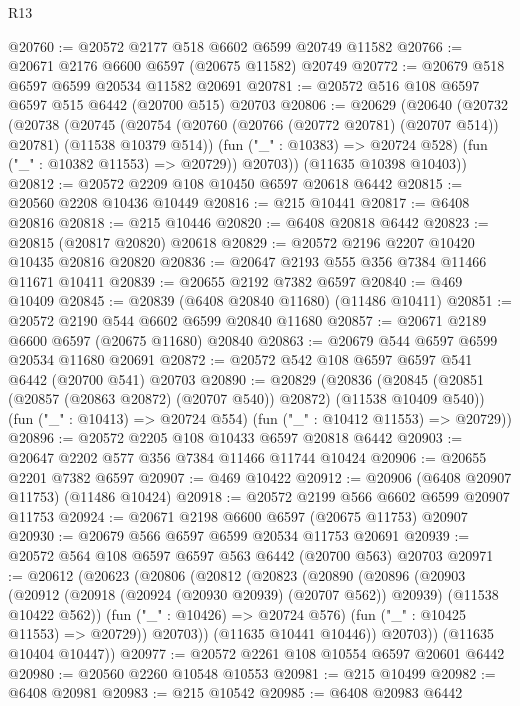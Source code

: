 \begin{lexlean}{R13}
\begin{coremodule}
@20760 := @20572 @2177 @518 @6602 @6599 @20749 @11582
@20766 := @20671 @2176 @6600 @6597 (@20675 @11582) @20749
@20772 := @20679 @518 @6597 @6599 @20534 @11582 @20691
@20781 := @20572 @516 @108 @6597 @6597 @515 @6442 (@20700 @515) @20703
@20806 := @20629
    (@20640
      (@20732
        (@20738
          (@20745
            (@20754 (@20760 (@20766 (@20772 @20781) (@20707 @514)) @20781) (@11538 @10379 @514))
            (fun ("_" : @10383) => @20724 @528)
            (fun ("_" : @10382 @11553) => @20729))
          @20703))
      (@11635 @10398 @10403))
@20812 := @20572 @2209 @108 @10450 @6597 @20618 @6442
@20815 := @20560 @2208 @10436 @10449
@20816 := @215 @10441
@20817 := @6408 @20816
@20818 := @215 @10446
@20820 := @6408 @20818 @6442
@20823 := @20815 (@20817 @20820) @20618
@20829 := @20572 @2196 @2207 @10420 @10435 @20816 @20820
@20836 := @20647 @2193 @555 @356 @7384 @11466 @11671 @10411
@20839 := @20655 @2192 @7382 @6597
@20840 := @469 @10409
@20845 := @20839 (@6408 @20840 @11680) (@11486 @10411)
@20851 := @20572 @2190 @544 @6602 @6599 @20840 @11680
@20857 := @20671 @2189 @6600 @6597 (@20675 @11680) @20840
@20863 := @20679 @544 @6597 @6599 @20534 @11680 @20691
@20872 := @20572 @542 @108 @6597 @6597 @541 @6442 (@20700 @541) @20703
@20890 := @20829
    (@20836
      (@20845 (@20851 (@20857 (@20863 @20872) (@20707 @540)) @20872) (@11538 @10409 @540))
      (fun ("_" : @10413) => @20724 @554)
      (fun ("_" : @10412 @11553) => @20729))
@20896 := @20572 @2205 @108 @10433 @6597 @20818 @6442
@20903 := @20647 @2202 @577 @356 @7384 @11466 @11744 @10424
@20906 := @20655 @2201 @7382 @6597
@20907 := @469 @10422
@20912 := @20906 (@6408 @20907 @11753) (@11486 @10424)
@20918 := @20572 @2199 @566 @6602 @6599 @20907 @11753
@20924 := @20671 @2198 @6600 @6597 (@20675 @11753) @20907
@20930 := @20679 @566 @6597 @6599 @20534 @11753 @20691
@20939 := @20572 @564 @108 @6597 @6597 @563 @6442 (@20700 @563) @20703
@20971 := @20612
    (@20623
      (@20806
        (@20812
          (@20823
            (@20890
              (@20896
                (@20903
                  (@20912
                    (@20918 (@20924 (@20930 @20939) (@20707 @562)) @20939)
                    (@11538 @10422 @562))
                  (fun ("_" : @10426) => @20724 @576)
                  (fun ("_" : @10425 @11553) => @20729))
                @20703))
            (@11635 @10441 @10446))
          @20703))
      (@11635 @10404 @10447))
@20977 := @20572 @2261 @108 @10554 @6597 @20601 @6442
@20980 := @20560 @2260 @10548 @10553
@20981 := @215 @10499
@20982 := @6408 @20981
@20983 := @215 @10542
@20985 := @6408 @20983 @6442

\end{coremodule}
\end{lexlean}
